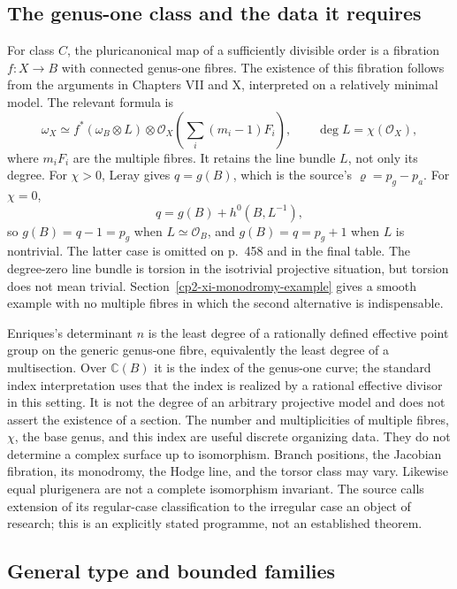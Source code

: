 \subsection{The genus-one class and the data it requires}

For class \(C\), the pluricanonical map of a sufficiently divisible order is a fibration \(f:X\to B\) with connected genus-one fibres. The existence of this fibration follows from the arguments in Chapters VII and X, interpreted on a relatively minimal model. The relevant formula is
\[
\omega_X\simeq f^*(\omega_B\otimes L)\otimes
\mathcal O_X\left(\sum_i(m_i-1)F_i\right),\qquad
\deg L=\chi(\mathcal O_X),
\]
where \(m_iF_i\) are the multiple fibres. It retains the line bundle \(L\), not only its degree. For \(\chi>0\), Leray gives \(q=g(B)\), which is the source's \(\varrho=p_g-p_a\). For \(\chi=0\),
\[
q=g(B)+h^0(B,L^{-1}),
\]
so \(g(B)=q-1=p_g\) when \(L\simeq\mathcal O_B\), and \(g(B)=q=p_g+1\) when \(L\) is nontrivial. The latter case is omitted on p.~458 and in the final table. The degree-zero line bundle is torsion in the isotrivial projective situation, but torsion does not mean trivial. Section~\ref{cp2-xi-monodromy-example} gives a smooth example with no multiple fibres in which the second alternative is indispensable.

Enriques's determinant \(n\) is the least degree of a rationally defined effective point group on the generic genus-one fibre, equivalently the least degree of a multisection. Over \(\mathbb C(B)\) it is the index of the genus-one curve; the standard index interpretation uses that the index is realized by a rational effective divisor in this setting. It is not the degree of an arbitrary projective model and does not assert the existence of a section. The number and multiplicities of multiple fibres, \(\chi\), the base genus, and this index are useful discrete organizing data. They do not determine a complex surface up to isomorphism. Branch positions, the Jacobian fibration, its monodromy, the Hodge line, and the torsor class may vary. Likewise equal plurigenera are not a complete isomorphism invariant. The source calls extension of its regular-case classification to the irregular case an object of research; this is an explicitly stated programme, not an established theorem.

\subsection{General type and bounded families}

